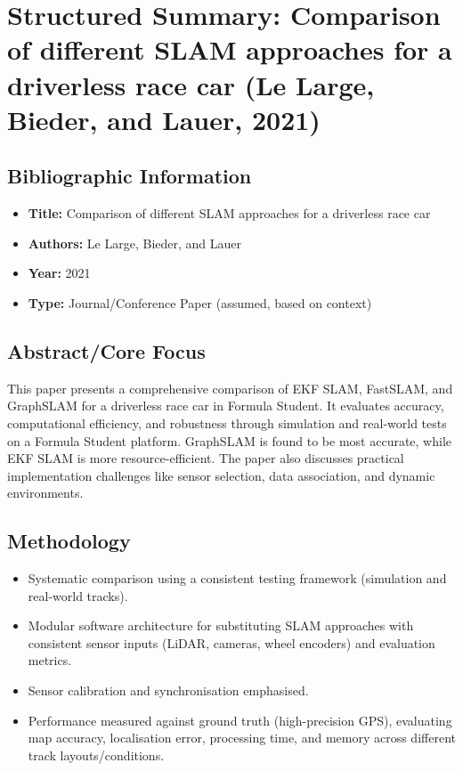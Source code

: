 \section{Structured Summary: Comparison of different SLAM approaches for a driverless race car (Le Large, Bieder, and Lauer, 2021)}\label{sec:le-large-bieder-lauer-2021}

\subsection{Bibliographic Information}\label{subsec:bibliographic-information2}
\begin{itemize}
    \item \textbf{Title:} Comparison of different SLAM approaches for a driverless race car
    \item \textbf{Authors:} Le Large, Bieder, and Lauer
    \item \textbf{Year:} 2021
    \item \textbf{Type:} Journal/Conference Paper (assumed, based on context)
\end{itemize}

\subsection{Abstract/Core Focus}\label{subsec:abstract/core-focus2}
This paper presents a comprehensive comparison of EKF SLAM, FastSLAM, and GraphSLAM for a driverless race car in Formula Student. It evaluates accuracy, computational efficiency, and robustness through simulation and real-world tests on a Formula Student platform. GraphSLAM is found to be most accurate, while EKF SLAM is more resource-efficient. The paper also discusses practical implementation challenges like sensor selection, data association, and dynamic environments.

\subsection{Methodology}\label{subsec:methodology}
\begin{itemize}
    \item Systematic comparison using a consistent testing framework (simulation and real-world tracks).
    \item Modular software architecture for substituting SLAM approaches with consistent sensor inputs (LiDAR, cameras, wheel encoders) and evaluation metrics.
    \item Sensor calibration and synchronisation emphasised.
    \item Performance measured against ground truth (high-precision GPS), evaluating map accuracy, localisation error, processing time, and memory across different track layouts/conditions.
\end{itemize}

